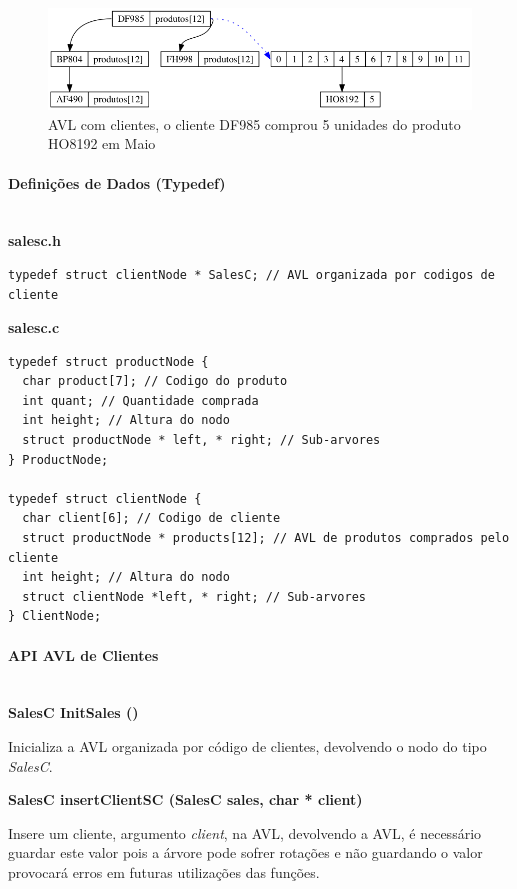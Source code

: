 \documentclass[10pt] {article}
\begin{document}
\begin{figure}[ht!]
\centering
\includegraphics[width=120mm]{avl_salesc.png}
\caption{AVL com clientes, o cliente DF985 comprou 5 unidades do produto HO8192 em Maio}
\end{figure}

\paragraph{Definições de Dados (Typedef)}\mbox{}\\
\textbf{salesc.h}
\begin{lstlisting}
typedef struct clientNode * SalesC; // AVL organizada por codigos de cliente
\end{lstlisting}
\textbf{salesc.c}
\begin{lstlisting}
typedef struct productNode {
  char product[7]; // Codigo do produto
  int quant; // Quantidade comprada
  int height; // Altura do nodo
  struct productNode * left, * right; // Sub-arvores
} ProductNode;

typedef struct clientNode {
  char client[6]; // Codigo de cliente
  struct productNode * products[12]; // AVL de produtos comprados pelo cliente
  int height; // Altura do nodo
  struct clientNode *left, * right; // Sub-arvores
} ClientNode;
\end{lstlisting}

\paragraph{API AVL de Clientes}\mbox{}\\
\noindent \textbf {SalesC InitSales ()}
\par Inicializa a AVL organizada por código de clientes, devolvendo o nodo do tipo \emph{SalesC}.

\noindent \textbf {SalesC insertClientSC (SalesC sales, char * client)}
\par Insere um cliente, argumento \emph{client}, na AVL, devolvendo a AVL, é necessário guardar este valor
pois a árvore pode sofrer rotações e não guardando o valor provocará erros em futuras utilizações das funções. \\
\end{document}
